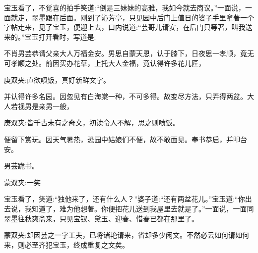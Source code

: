 \begin{parag}
    宝玉看了，不觉喜的拍手笑道:“倒是三妹妹的高雅，我如今就去商议。”一面说，一面就走，翠墨跟在后面。刚到了沁芳亭，只见园中后门上值日的婆子手里拿著一个字帖走来，见了宝玉，便迎上去，口内说道:“芸哥儿请安，在后门只等著，叫我送来的。”宝玉打开看时，写道是:
\end{parag}


\begin{qute2sp}
    \begin{parag}
        不肖男芸恭请父亲大人万福金安。男思自蒙天恩，认于膝下，日夜思一孝顺，竟无可孝顺之处。前因买办花草，上托大人金福，竟认得许多花儿匠，\begin{note}庚双夹:直欲喷饭，真好新鲜文字。\end{note}并认得许多名园。因忽见有白海棠一种，不可多得。故变尽方法，只弄得两盆。大人若视男是亲男一般，\begin{note}庚双夹:皆千古未有之奇文，初读令人不解，思之则喷饭。\end{note}便留下赏玩。因天气暑热，恐园中姑娘们不便，故不敢面见。奉书恭启，并叩台安。
    \end{parag}

    \begin{parag}
        男芸跪书。\begin{note}蒙双夹:一笑\end{note}
    \end{parag}
\end{qute2sp}


\begin{parag}
    宝玉看了，笑道:“独他来了，还有什么人？”婆子道:“还有两盆花儿。”宝玉道:“你出去说，我知道了，难为他想著。你便把花儿送到我屋里去就是了。”一面说，一面同翠墨往秋爽斋来，只见宝钗、黛玉、迎春、惜春已都在那里了。\begin{note}蒙双夹:却因芸之一字工夫，已将诸艳请来，省却多少闲文。不然必云如何请如何来，则必至齐犯宝玉，终成重复之文矣。\end{note}
\end{parag}


